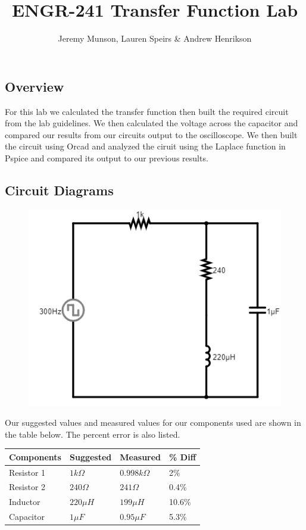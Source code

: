 \documentclass[11pt]{article}
\title{ENGR-241 Transfer Function Lab}
\author{Jeremy Munson, Lauren Speirs \& Andrew Henrikson}
\begin{document}
	\maketitle
	\subsection*{Overview}
	For this lab we calculated the transfer function then built the required circuit from the lab guidelines. We then calculated the voltage across the capacitor and compared our results from our circuits output to the oscilloscope. We then built the circuit using Orcad and analyzed the ciruit using the Laplace function in Pspice and compared its output to our previous results.
		\subsection*{Circuit Diagrams}
			\begin{figure}[H]
			\centering
			\includegraphics[width=5in]{images/diagram.png}
		\end{figure}
		
		Our suggested values and measured values for our components used are shown in the table below. The percent error is also listed.
		\begin{table}[H]
		\def\arraystretch{1.2}%
		\begin{tabular}{|l|l|l|l|}
			\hline
			Components       	& Suggested 		& Measured      	&\% Diff	\\ \hline
			Resistor 1   		& $1 k\Omega$		& $0.998 k\Omega$   & 2\%	     \\ \hline	
			Resistor 2			& $240 \Omega$		& $241 \Omega$      & 0.4\%       \\ \hline
			Inductor			& $220\mu H$		& $199\mu H$		& 10.6\%		\\ \hline
			Capacitor			& $1 \mu F$			& $0.95 \mu F$		&5.3\%		\\ \hline
		\end{tabular}
	\end{table}
	
\end{document}

